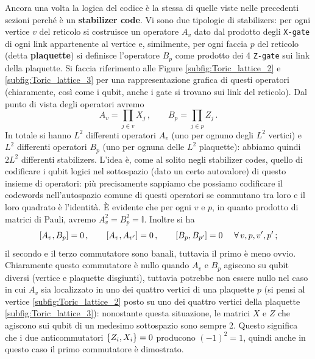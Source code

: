\noindent Ancora una volta la logica del codice è la stessa di quelle viste nelle precedenti sezioni perché è un \textbf{stabilizer code}. Vi sono due tipologie di stabilizers: per ogni vertice $v$ del reticolo si costruisce un operatore $A_v$ dato dal prodotto degli \texttt{X-gate} di ogni link appartenente al vertice e, similmente, per ogni faccia $p$ del reticolo (detta \textbf{plaquette}) si definisce l'operatore $B_p$ come prodotto dei 4 \texttt{Z-gate} sui link della plaquette. Si faccia riferimento alle Figure \ref{subfig:Toric_lattice_2} e \ref{subfig:Toric_lattice_3} per una rappresentazione grafica di questi operatori (chiaramente, così come i qubit, anche i gate si trovano sui link del reticolo). Dal punto di vista degli operatori avremo 
\begin{equation}\label{A_B}
    A_v = \prod_{j \in v} X_j \, , \qquad B_p = \prod_{j \in p} Z_j \, .
\end{equation}
In totale si hanno $L^2$ differenti operatori $A_v$ (uno per ognuno degli $L^2$ vertici) e $L^2$ differenti operatori $B_p$ (uno per ognuna delle $L^2$ plaquette): abbiamo quindi $2L^2$ differenti stabilizers. L'idea è, come al solito negli stabilizer codes, quello di codificare i qubit logici nel sottospazio (dato un certo autovalore) di questo insieme di operatori: più precisamente sappiamo che possiamo codificare il codewords nell'autospazio comune di questi operatori se commutano tra loro e il loro quadrato è l'identità. È evidente che per ogni $v$ e $p$, in quanto prodotto di matrici di Pauli, avremo $A^2_v = B^2_p = \mathbb{I}$. Inoltre si ha
\begin{equation}\label{commutatori_A_B}
    \comm{A_v}{B_p} = 0 \, , \qquad \comm{A_v}{A_{v'}} = 0 \, , \qquad \comm{B_p}{B_{p'}} = 0 \, \, \quad \forall \, v,p,v',p' \, ;
\end{equation}
il secondo e il terzo commutatore sono banali, tuttavia il primo è meno ovvio. Chiaramente questo commutatore è nullo quando $A_v$ e $B_p$ agiscono su qubit diversi (vertice e plaquette disgiunti), tuttavia potrebbe non essere nullo nel caso in cui $A_v$ sia localizzato in uno dei quattro vertici di una plaquette $p$ (si pensi al vertice \ref{subfig:Toric_lattice_2} posto su uno dei quattro vertici della plaquette \ref{subfig:Toric_lattice_3}): nonostante questa situazione, le matrici $X$ e $Z$ che agiscono sui qubit di un medesimo sottospazio sono sempre 2. Questo significa che i due anticommutatori $\acomm{Z_i}{X_i} = 0$ producono $(-1)^2 = 1$, quindi anche in questo caso il primo commutatore è dimostrato. 

